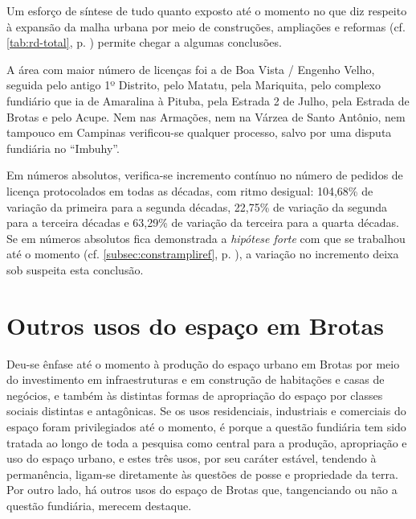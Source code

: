 Um esforço de síntese de tudo quanto exposto até o momento no que diz respeito à expansão da malha urbana por meio de construções, ampliações e reformas (cf. \autoref{tab:rd-total}, p. \pageref{tab:rd-total}) permite chegar a algumas conclusões.



A área com maior número de licenças foi a de Boa Vista / Engenho Velho, seguida pelo antigo 1º Distrito, pelo Matatu, pela Mariquita, pelo complexo fundiário que ia de Amaralina à Pituba, pela Estrada 2 de Julho, pela Estrada de Brotas e pelo Acupe. Nem nas Armações, nem na Várzea de Santo Antônio, nem tampouco em Campinas verificou-se qualquer processo, salvo por uma disputa fundiária no ``Imbuhy''.

Em números absolutos, verifica-se incremento contínuo no número de pedidos de licença protocolados em todas as décadas, com ritmo desigual: 104,68\% de variação da primeira para a segunda décadas, 22,75\% de variação da segunda para a terceira décadas e 63,29\% de variação da terceira para a quarta décadas. Se em números absolutos fica demonstrada a \textit{hipótese forte} com que se trabalhou até o momento (cf. \autoref{subsec:constrampliref}, p. \pageref{subsec:constrampliref}), a variação no incremento deixa sob suspeita esta conclusão.

\section{Outros usos do espaço em Brotas}

Deu-se ênfase até o momento à produção do espaço urbano em Brotas por meio do investimento em infraestruturas e em construção de habitações e casas de negócios, e também às distintas formas de apropriação do espaço por classes sociais distintas e antagônicas. Se os usos residenciais, industriais e comerciais do espaço foram privilegiados até o momento, é porque a questão fundiária tem sido tratada ao longo de toda a pesquisa como central para a produção, apropriação e uso do espaço urbano, e estes três usos, por seu caráter estável, tendendo à permanência, ligam-se diretamente às questões de posse e propriedade da terra. Por outro lado, há outros usos do espaço de Brotas que, tangenciando ou não a questão fundiária, merecem destaque.

